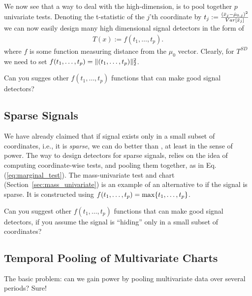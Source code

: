 We now see that a way to deal with the high-dimension, is to pool together $p$ univariate tests.
Denoting the t-statistic of the $j$'th coordinate by $t_j:= \frac{(\bar{x}_j - \hat{\mu}_{0,j})^2}{\mathop{Var} \left[ \bar{x}_j \right]}$ we can now easily design many high dimensional signal detectors in the form of
\begin{align}
\label{eq:marginal_test}
	 	T(x) :=  f(t_1,\dots,t_p) .
\end{align}
where $f$ is some function measuring distance from the $\mu_0$ vector.
Clearly, for $T^{SD}$ we need to set $f(t_1,\dots,t_p) = \Vert (t_1,\dots,t_p) \Vert_2^2$.

\begin{think}
Can you sugges other $f(t_1,\dots,t_p)$ functions that can make good signal detectors?
\end{think}



\subsection{Sparse Signals}

We have already claimed that if signal exists only in a small subset of coordinates, i.e., it is \emph{sparse}, we can do better than \tsq, at least in the sense of power.
The way to design detectors for sparse signals, relies on the idea of computing coordinate-wise tests, and pooling them together, as in Eq.(\ref{eq:marginal_test}). 
The mass-univariate test and chart (Section~\ref{sec:mass_univariate}) is an example of an alternative to \tsq if the signal is sparse. 
It is constructed using 
$f(t_1,\dots,t_p)=\max\{ t_1,\dots,t_p \}$.


\begin{think}
Can you suggest other $f(t_1,\dots,t_p)$ functions that can make good signal detectors, if you assume the signal is ``hiding'' only in a small subset of coordinates?
\end{think}











\subsection{Temporal Pooling of Multivariate Charts}
The basic problem: can we gain power by pooling multivariate data over several periods?
Sure!

